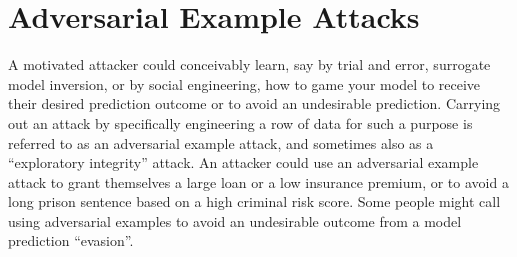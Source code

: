 \documentclass[fleqn]{article}
\begin{document}
\section{Adversarial Example Attacks}

A motivated attacker could conceivably learn, say by trial and error, surrogate model inversion, or by social engineering, how to game your model to receive their desired prediction outcome or to avoid an undesirable prediction. Carrying out an attack by specifically engineering a row of data for such a purpose is referred to as an adversarial example attack, and sometimes also as a ``exploratory integrity'' attack. An attacker could use an adversarial example attack to grant themselves a large loan or a low insurance premium, or to avoid a long prison sentence based on a high criminal risk score. Some people might call using adversarial examples to avoid an undesirable outcome from a model prediction ``evasion''.\\
\end{document}
